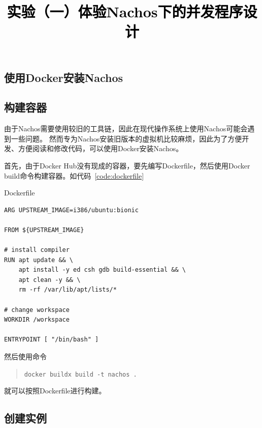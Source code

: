 \documentclass[a4paper,twoside]{article}
\newcommand{\PaperTitle}{实验（一）体验Nachos下的并发程序设计}  %
\begin{document}
\newpage

\title{
	\Large{\textcolor{black}{\PaperTitle}}
}

\maketitle
	
\tableofcontents
 
\newpage
\setcounter{page}{1}

\begin{spacing}{1.2}

\section{使用Docker安装Nachos}

\subsection{构建容器}

由于Nachos需要使用较旧的工具链，因此在现代操作系统上使用Nachos可能会遇到一些问题。
然而专为Nachos安装旧版本的虚拟机比较麻烦，因此为了方便开发、方便阅读和修改代码，可以使用Docker安装Nachos。

首先，由于Docker Hub没有现成的容器，要先编写Dockerfile，然后使用Docker build命令构建容器。如代码~\ref{code:dockerfile}
\begin{listing}[htb]
	\caption{Dockerfile}
	\label{code:dockerfile}
    \begin{verbatim}
ARG UPSTREAM_IMAGE=i386/ubuntu:bionic

FROM ${UPSTREAM_IMAGE}

# install compiler
RUN apt update && \
    apt install -y ed csh gdb build-essential && \
    apt clean -y && \
    rm -rf /var/lib/apt/lists/*

# change workspace
WORKDIR /workspace

ENTRYPOINT [ "/bin/bash" ]
	\end{verbatim}
\end{listing}
然后使用命令
\begin{quotation}
	\texttt{docker buildx build -t nachos  .}
\end{quotation}
就可以按照Dockerfile进行构建。

\subsection{创建实例}


\end{spacing}
\end{document}
